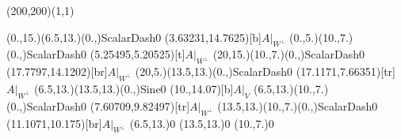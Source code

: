 \unitlength=1bp%

\begin{feynartspicture}(200,200)(1,1)

\FADiagram{}
\FAProp(0.,15.)(6.5,13.)(0.,){ScalarDash}{0}
\FALabel(3.63231,14.7625)[b]{$A|_{W^\perp}$}
\FAProp(0.,5.)(10.,7.)(0.,){ScalarDash}{0}
\FALabel(5.25495,5.20525)[t]{$A|_{W^\perp}$}
\FAProp(20,15.)(10.,7.)(0.,){ScalarDash}{0}
\FALabel(17.7797,14.1202)[br]{$A|_{W^\perp}$}
\FAProp(20,5.)(13.5,13.)(0.,){ScalarDash}{0}
\FALabel(17.1171,7.66351)[tr]{$A|_{W^\perp}$}
\FAProp(6.5,13.)(13.5,13.)(0.,){Sine}{0}
\FALabel(10.,14.07)[b]{$A|_V$}
\FAProp(6.5,13.)(10.,7.)(0.,){ScalarDash}{0}
\FALabel(7.60709,9.82497)[tr]{$A|_{W^\perp}$}
\FAProp(13.5,13.)(10.,7.)(0.,){ScalarDash}{0}
\FALabel(11.1071,10.175)[br]{$A|_{W^\perp}$}
\FAVert(6.5,13.){0}
\FAVert(13.5,13.){0}
\FAVert(10.,7.){0}
\end{feynartspicture}


